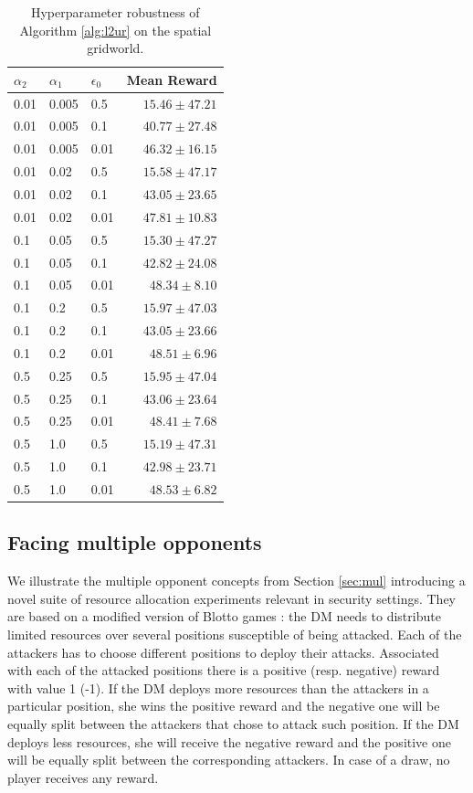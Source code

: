 \begingroup
\renewcommand{\arraystretch}{0.7}
\begin{table}[h]
\small
\caption{Hyperparameter robustness of Algorithm \ref{alg:l2ur} on the spatial gridworld.}\label{tab:rob}
\centering
\begin{tabular}{lllr}
\hline
$\alpha_2$ &  $\alpha_1$ & $\epsilon_0$ & Mean Reward \\
\hline
0.01 & 0.005 & 0.5 & $15.46 \pm 47.21$  \\
0.01 & 0.005 & 0.1 & $40.77 \pm 27.48$  \\
0.01 & 0.005 & 0.01 & $46.32 \pm 16.15$  \\\hline
0.01 & 0.02 & 0.5 & $15.58 \pm 47.17$  \\
0.01 & 0.02 & 0.1 & $43.05 \pm 23.65$  \\
0.01 & 0.02 & 0.01 & $47.81 \pm 10.83$  \\\hline
0.1 & 0.05 & 0.5 & $15.30 \pm 47.27$  \\
0.1 & 0.05 & 0.1 & $42.82 \pm 24.08$  \\
0.1 & 0.05 & 0.01 & $48.34 \pm 8.10$  \\\hline
0.1 & 0.2 & 0.5 & $15.97 \pm 47.03$  \\
0.1 & 0.2 & 0.1 & $43.05 \pm 23.66$  \\
0.1 & 0.2 & 0.01 & $48.51 \pm 6.96$  \\\hline
 0.5 & 0.25 & 0.5 & $15.95 \pm 47.04$  \\
 0.5 & 0.25 & 0.1 & $43.06 \pm 23.64$  \\
 0.5 & 0.25 & 0.01 & $48.41 \pm 7.68$  \\\hline
 0.5 & 1.0 & 0.5 & $15.19 \pm 47.31$  \\
 0.5 & 1.0 & 0.1 & $42.98 \pm 23.71$    \\
 0.5 & 1.0 & 0.01 & $48.53 \pm 6.82$  \\\hline
\end{tabular}
\end{table} 
\endgroup
\subsection{Facing multiple opponents}

We illustrate the multiple opponent concepts from Section \ref{sec:mul} introducing a novel suite of  resource allocation experiments 
relevant in security settings. They are based on a modified version of Blotto games \cite{hart2008discrete}: the DM needs to distribute limited
resources over several positions susceptible of being attacked. Each of the attackers has to choose different positions
to deploy their attacks. Associated with each of the attacked positions there is a positive (resp. negative) reward with value 1 (-1). If the DM 
deploys more resources than the attackers in a particular position, she wins the positive reward and the negative one will be equally split  between
the attackers that chose to attack such position. If the DM deploys less resources, she will receive
the negative reward and the positive one will be equally split between the corresponding attackers.
In case of a draw, no player receives any reward.  


